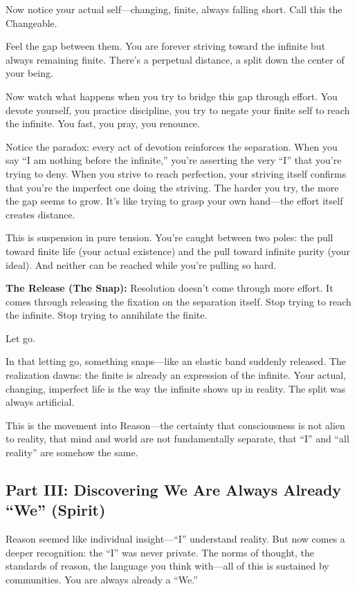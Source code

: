 Now notice your actual self---changing, finite, always falling short. Call this the Changeable.

Feel the gap between them. You are forever striving toward the infinite but always remaining finite. There's a perpetual distance, a split down the center of your being.

Now watch what happens when you try to bridge this gap through effort. You devote yourself, you practice discipline, you try to negate your finite self to reach the infinite. You fast, you pray, you renounce.

Notice the paradox: every act of devotion reinforces the separation. When you say ``I am nothing before the infinite,'' you're asserting the very ``I'' that you're trying to deny. When you strive to reach perfection, your striving itself confirms that you're the imperfect one doing the striving. The harder you try, the more the gap seems to grow. It's like trying to grasp your own hand---the effort itself creates distance.

This is suspension in pure tension. You're caught between two poles: the pull toward finite life (your actual existence) and the pull toward infinite purity (your ideal). And neither can be reached while you're pulling so hard.

\textbf{The Release (The Snap):} Resolution doesn't come through more effort. It comes through releasing the fixation on the separation itself. Stop trying to reach the infinite. Stop trying to annihilate the finite.

Let go.

In that letting go, something snaps---like an elastic band suddenly released. The realization dawns: the finite is already an expression of the infinite. Your actual, changing, imperfect life is the way the infinite shows up in reality. The split was always artificial.

This is the movement into Reason---the certainty that consciousness is not alien to reality, that mind and world are not fundamentally separate, that ``I'' and ``all reality'' are somehow the same.

\subsection{Part III: Discovering We Are Always Already ``We'' (Spirit)}\label{part-iii-discovering-we-are-always-already-we-spirit}

Reason seemed like individual insight---``I'' understand reality. But now comes a deeper recognition: the ``I'' was never private. The norms of thought, the standards of reason, the language you think with---all of this is sustained by communities. You are always already a ``We.''

